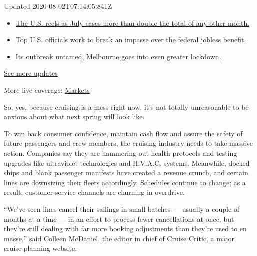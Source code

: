Updated 2020-08-02T07:14:05.841Z

\begin{itemize}
\tightlist
\item
  \href{https://www.nytimes.com/2020/08/01/world/coronavirus-covid-19.html?action=click\&pgtype=Article\&state=default\&region=MAIN_CONTENT_1\&context=storylines_live_updates\#link-34047410}{The
  U.S. reels as July cases more than double the total of any other
  month.}
\item
  \href{https://www.nytimes.com/2020/08/01/world/coronavirus-covid-19.html?action=click\&pgtype=Article\&state=default\&region=MAIN_CONTENT_1\&context=storylines_live_updates\#link-780ec966}{Top
  U.S. officials work to break an impasse over the federal jobless
  benefit.}
\item
  \href{https://www.nytimes.com/2020/08/01/world/coronavirus-covid-19.html?action=click\&pgtype=Article\&state=default\&region=MAIN_CONTENT_1\&context=storylines_live_updates\#link-2bc8948}{Its
  outbreak untamed, Melbourne goes into even greater lockdown.}
\end{itemize}

\href{https://www.nytimes.com/2020/08/01/world/coronavirus-covid-19.html?action=click\&pgtype=Article\&state=default\&region=MAIN_CONTENT_1\&context=storylines_live_updates}{See
more updates}

More live coverage:
\href{https://www.nytimes.com/live/2020/07/31/business/stock-market-today-coronavirus?action=click\&pgtype=Article\&state=default\&region=MAIN_CONTENT_1\&context=storylines_live_updates}{Markets}

So, yes, because cruising is a mess right now, it's not totally
unreasonable to be anxious about what next spring will look like.

To win back consumer confidence, maintain cash flow and assure the
safety of future passengers and crew members, the cruising industry
needs to take massive action. Companies say they are hammering out
health protocols and testing upgrades like ultraviolet technologies and
H.V.A.C. systems. Meanwhile, docked ships and blank passenger manifests
have created a revenue crunch, and certain lines are downsizing their
fleets accordingly. Schedules continue to change; as a result,
customer-service channels are churning in overdrive.

``We've seen lines cancel their sailings in small batches --- usually a
couple of months at a time --- in an effort to process fewer
cancellations at once, but they're still dealing with far more booking
adjustments than they're used to en masse,'' said Colleen McDaniel, the
editor in chief of \href{https://www.cruisecritic.com/}{Cruise Critic},
a major cruise-planning website.

